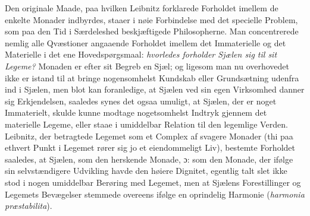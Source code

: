 \documentclass[12pt]{book}
\newcommand{\dsi}{\textup{ɔ:}}
\newcommand{\opage}[1]{\marginnote{\footnotesize\textit{[#1]}}}
\begin{document}
Den originale Maade, paa hvilken Leibnitz forklarede Forholdet imellem de enkelte
Monader indbyrdes, staaer i nøie Forbindelse med det specielle Problem, som paa den Tid
\opage{170} %
%
%
%
i Særdeleshed beskjæftigede Philosopherne. Man concentrerede nemlig alle Qvæstioner
angaaende Forholdet imellem det Immaterielle og det Materielle i det ene
Hovedspørgsmaal: \emph{hvorledes forholder Sjælen sig til sit Legeme?} Monaden er efter
sit Begreb en Sjæl; og ligesom man nu overhovedet ikke er istand til at bringe
nogensomhelst Kundskab eller Grundsætning udenfra ind i Sjælen, men blot kan
foranledige, at Sjælen ved sin egen Virksomhed danner sig Erkjendelsen, saaledes synes
det ogsaa umuligt, at Sjælen, der er noget Immaterielt, skulde kunne modtage
nogetsomhelst Indtryk gjennem det materielle Legeme, eller staae i umiddelbar Relation
til den legemlige Verden. Leibnitz, der betragtede Legemet som et Complex af svagere
Monader (thi paa ethvert Punkt i Legemet rører sig jo et eiendommeligt Liv), bestemte
Forholdet saaledes, at Sjælen, som den herskende Monade, \dsi{} som den Monade, der
ifølge sin selvstændigere Udvikling havde den høiere Dignitet, egentlig talt slet ikke
stod i nogen umiddelbar Berøring med Legemet, men at Sjælens Forestillinger og Legemets
Bevægelser stemmede overeens ifølge en oprindelig Harmonie
(\textit{harmonia præstabilita}).
\end{document}
